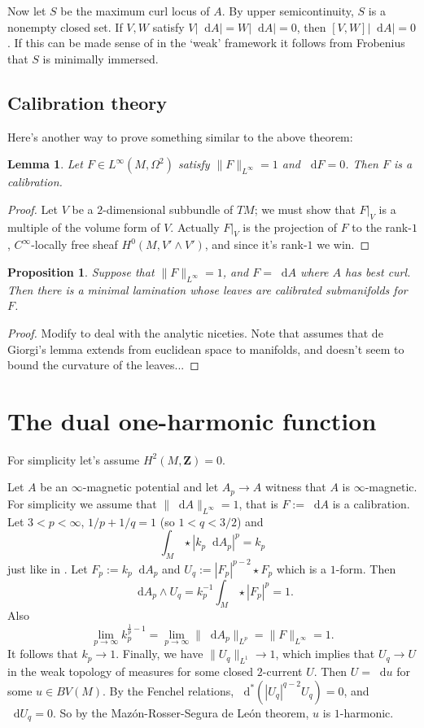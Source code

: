 \documentclass[reqno,11pt]{amsart}
\newcommand{\ZZ}{\mathbf{Z}}
\newcommand*\dif{\mathop{}\!\mathrm{d}}
\newtheorem{lemma}[theorem]{Lemma}
\newtheorem{proposition}[theorem]{Proposition}
\theoremstyle{definition}
\numberwithin{equation}{section}
\begin{document}
Now let $S$ be the maximum curl locus of $A$.
By upper semicontinuity, $S$ is a nonempty closed set.
If $V, W$ satisfy $V|\dif A| = W|\dif A| = 0$, then $[V, W]|\dif A| = 0$.
If this can be made sense of in the `weak' framework it follows from Frobenius that $S$ is minimally immersed.


\subsection{Calibration theory}
Here's another way to prove something similar to the above theorem:

\begin{lemma}
Let $F \in L^\infty(M, \Omega^2)$ satisfy $\|F\|_{L^\infty} = 1$ and $\dif F = 0$.
Then $F$ is a calibration.
\end{lemma}
\begin{proof}
Let $V$ be a $2$-dimensional subbundle of $TM$; we must show that $F|_V$ is a multiple of the volume form of $V$.
Actually $F|_V$ is the projection of $F$ to the rank-$1$, $C^\infty$-locally free sheaf $H^0(M, V' \wedge V')$, and since it's rank-$1$ we win.
\end{proof}

\begin{proposition}
Suppose that $\|F\|_{L^\infty} = 1$, and $F = \dif A$ where $A$ has best curl.
Then there is a minimal lamination whose leaves are calibrated submanifolds for $F$.
\end{proposition}
\begin{proof}
Modify \cite[Theorem 5.1]{bangert_cui_2017} to deal with the analytic niceties.
Note that \cite{bangert_cui_2017} assumes that de Giorgi's lemma extends from euclidean space to manifolds, and doesn't seem to bound the curvature of the leaves...
\end{proof}

\section{The dual one-harmonic function}
For simplicity let's assume $H^2(M, \ZZ) = 0$.

Let $A$ be an $\infty$-magnetic potential and let $A_p \to A$ witness that $A$ is $\infty$-magnetic.
For simplicity we assume that $\|\dif A\|_{L^\infty} = 1$, that is $F := \dif A$ is a calibration.
Let $3 < p < \infty$, $1/p + 1/q = 1$ (so $1 < q < 3/2$) and
$$\int_M \star |k_p \dif A_p|^p = k_p$$
just like in \cite[\S3.2]{daskalopoulos2020transverse}.
Let $F_p := k_p \dif A_p$ and $U_q := |F_p|^{p - 2} \star F_p$ which is a $1$-form.
Then 
$$\dif A_p \wedge U_q = k_p^{-1} \int_M \star |F_p|^p = 1.$$
Also 
$$\lim_{p \to \infty} k_p^{\frac{1}{p} - 1} = \lim_{p \to \infty} \|\dif A_p\|_{L^p} = \|F\|_{L^\infty} = 1.$$
It follows that $k_p \to 1$.
Finally, we have $\|U_q\|_{L^1} \to 1$, which implies that $U_q \to U$ in the weak topology of measures for some closed $2$-current $U$.
Then $U = \dif u$ for some $u \in BV(M)$.
By the Fenchel relations, $\dif^*(|U_q|^{q - 2} U_q) = 0$, and $\dif U_q = 0$.
So by the Maz\'on-Rosser-Segura de Le\'on theorem, $u$ is $1$-harmonic.
\end{document}
